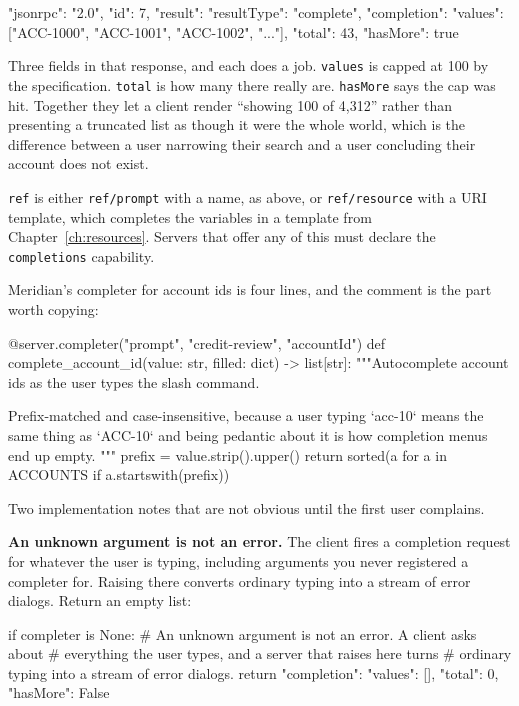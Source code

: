 \begin{wire}
{
  "jsonrpc": "2.0",
  "id": 7,
  "result": {
    "resultType": "complete",
    "completion": {
      "values": ["ACC-1000", "ACC-1001", "ACC-1002", "..."],
      "total": 43,
      "hasMore": true
    }
  }
}
\end{wire}

Three fields in that response, and each does a job. \texttt{values} is capped at
100 by the specification. \texttt{total} is how many there really are.
\texttt{hasMore} says the cap was hit. Together they let a client render
``showing 100 of 4,312'' rather than presenting a truncated list as though it
were the whole world, which is the difference between a user narrowing their
search and a user concluding their account does not exist.

\texttt{ref} is either \texttt{ref/prompt} with a name, as above, or
\texttt{ref/resource} with a URI template, which completes the variables in a
template from Chapter~\ref{ch:resources}. Servers that offer any of this must
declare the \texttt{completions} capability.

Meridian's completer for account ids is four lines, and the comment is the part
worth copying:

\begin{py}
@server.completer("prompt", "credit-review", "accountId")
def complete_account_id(value: str, filled: dict) -> list[str]:
    """Autocomplete account ids as the user types the slash command.

    Prefix-matched and case-insensitive, because a user typing `acc-10`
    means the same thing as `ACC-10` and being pedantic about it is how
    completion menus end up empty.
    """
    prefix = value.strip().upper()
    return sorted(a for a in ACCOUNTS if a.startswith(prefix))
\end{py}

Two implementation notes that are not obvious until the first user complains.

\textbf{An unknown argument is not an error.} The client fires a completion
request for whatever the user is typing, including arguments you never
registered a completer for. Raising there converts ordinary typing into a stream
of error dialogs. Return an empty list:

\begin{py}
if completer is None:
    # An unknown argument is not an error. A client asks about
    # everything the user types, and a server that raises here turns
    # ordinary typing into a stream of error dialogs.
    return {"completion": {"values": [], "total": 0, "hasMore": False}}
\end{py}

